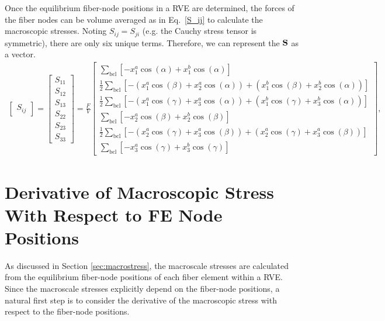 Once the equilibrium fiber-node positions in a RVE are determined, the forces of the fiber nodes can be volume averaged as in Eq.\ \eqref{S_ij} to calculate the macroscopic stresses.
%
Noting $S_{ij} = S_{ji}$ (e.g. the Cauchy stress tensor is symmetric), there are only six unique terms. Therefore, we can represent the \(\mathbf{S}\) as a vector.
%
\begin{eqnarray}
\begin{bmatrix}
S_{ij}
\end{bmatrix} = 
%
\begin{bmatrix}
S_{11} \\ S_{12} \\ S_{13} \\ S_{22} \\ S_{23} \\ S_{33} 
\end{bmatrix} =
%
\frac{F}{V} \begin{bmatrix}
\sum_{\text{bcl}} \left[ - x^a_1  \cos(\alpha) + x^b_1 \cos(\alpha) \right] \\ 
%
\frac{1}{2}\sum_{\text{bcl}}  \left[-\left( x^a_1  \cos(\beta)+ x^a_2 \cos(\alpha) \right) + \left( x^b_1  \cos(\beta)+ x^b_2 \cos(\alpha) \right) \right] \\ 
%
\frac{1}{2}\sum_{\text{bcl}} \left[ -\left(x^a_1 \cos(\gamma) + x^a_3 \cos(\alpha) \right) + \left(x^b_1 \cos(\gamma) + x^b_3 \cos(\alpha) \right) \right] \\ 
%
\sum_{\text{bcl}} \left[-x^a_2 \cos(\beta) + x^b_2 \cos(\beta) \right]\\
%
\frac{1}{2} \sum_{\text{bcl}} \left[-\left(x^a_2 \cos(\gamma) + x^a_3 \cos(\beta) \right) + \left(x^a_2 \cos(\gamma) + x^a_3 \cos(\beta) \right)\right] \\
%
\sum_{\text{bcl}} \left[ -x^a_3 \cos(\gamma) + x^b_3 \cos(\gamma) \right]
\end{bmatrix}  ,
\label{S_ij_vector}
\end{eqnarray}
%
\section{Derivative of Macroscopic Stress With Respect to FE Node Positions}

As discussed in Section \ref{sec:macrostress}, the macroscale stresses are calculated from the equilibrium fiber-node positions of each fiber element within a RVE. Since the macroscale stresses explicitly depend on the fiber-node positions, a natural first step is to consider the derivative of the macroscopic stress with respect to the fiber-node positions.

